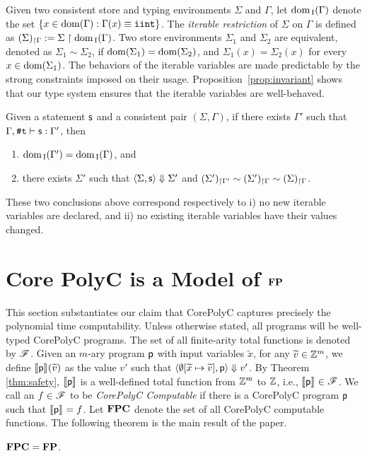 \documentclass[runningheads]{llncs}
\begin{document}
Given two consistent store and typing environments $\Sigma$ and $\Gamma$, let $\mathrm{dom}_{\mathrm{\,I}}(\Gamma)$ denote the set $\{x \in \mathrm{dom}(\Gamma) : \Gamma(x) \equiv \mathtt{iint}\}$.
The \textit{iterable restriction} of $\Sigma$ on $\Gamma$ is defined as ${(\Sigma)_{\restriction \Gamma}} := \Sigma \restriction \mathrm{dom}_{\mathrm{\,I}}(\Gamma)$.
Two store environments $\Sigma_1$ and $\Sigma_2$ are equivalent, denoted as $\Sigma_1 \sim \Sigma_2$, if  $\mathrm{dom}(\Sigma_1) = \mathrm{dom}(\Sigma_2)$, and $\Sigma_1(x) = \Sigma_2(x)$ for every $x \in \mathrm{dom}(\Sigma_1)$.
The behaviors of the iterable variables are made predictable by the strong constraints imposed on their usage.
Proposition~\ref{prop:invariant} shows that our type system ensures that the iterable variables are well-behaved.

\begin{proposition}
\label{prop:invariant}
Given a statement $\mathsf{s}$ and a consistent pair $(\Sigma,\Gamma)$, if there exists $\Gamma'$ such that $\Gamma,\texttt{\#}\mathtt{t}\vdash\mathsf{s}:\Gamma'$, then
\begin{enumerate}
    \item $\mathrm{dom}_{\mathrm{\,I}}(\Gamma')=\mathrm{dom}_{\mathrm{\,I}}(\Gamma)$, and
    \item there exists $\Sigma'$ such that $\langle\Sigma,\mathsf{s}\rangle\Downarrow{\Sigma'}$ and ${(\Sigma')_{\restriction \Gamma'}}\sim{(\Sigma')_{\restriction \Gamma}}\sim{(\Sigma)_{\restriction \Gamma}}$.
\end{enumerate}
These two conclusions above correspond respectively to i) no new iterable variables are declared, and ii) no existing iterable variables have their values changed.
\end{proposition}

\section{Core PolyC is a Model of $\mathbf{FP}$}\label{sec:main_theorem}

This section substantiates our claim that CorePolyC captures precisely the polynomial time computability.
Unless otherwise stated, all programs will be well-typed CorePolyC programs.
The set of all finite-arity total functions is denoted by $\mathscr{F}$.
Given an $m$-ary program $\mathsf{p}$ with input variables $\widetilde{x}$, for any $\widetilde{v}\in\mathbb{Z}^{m}$, we define $\llbracket\mathsf{p}\rrbracket_{}{(\widetilde{v})}$ as the value $v'$ such that $\langle\emptyset[\widetilde{x}\mapsto\widetilde{v}],\mathsf{p}\rangle\Downarrow{v'}$.
By Theorem \ref{thm:safety}, $\llbracket\mathsf{p}\rrbracket_{}$ is a well-defined total function from $\mathbb{Z}^{m}$ to $\mathbb{Z}$, i.e., $\llbracket\mathsf{p}\rrbracket_{}\in\mathscr{F}$.
We call an $f\in \mathscr{F}$ to be  \textit{CorePolyC Computable} if there is a CorePolyC program $\mathsf{p}$ such that $\llbracket\mathsf{p}\rrbracket_{}=f$.
Let $\mathbf{FPC}$ denote the set of all CorePolyC computable functions.
The following theorem is the main result of the paper.
\begin{theorem}\label{thm:main}
$\mathbf{FPC}=\mathbf{FP}$.
\end{theorem}
\end{document}
